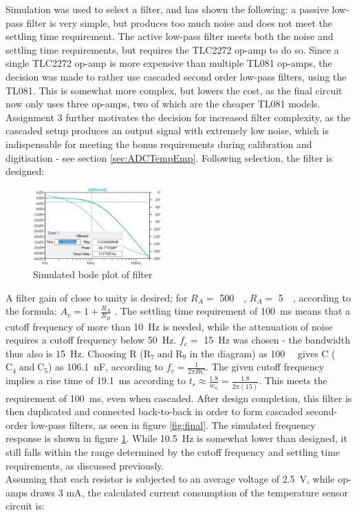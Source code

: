 Simulation was used to select a filter, and has shown the following: a passive low-pass filter is very simple, but produces too much noise and does not meet the settling time requirement. The active low-pass filter meets both the noise and settling time requirements, but requires the TLC2272 op-amp to do so. Since a single TLC2272 op-amp is more expensive than multiple TL081 op-amps, the decision was made to rather use cascaded second order low-pass filters, using the TL081. This is somewhat more complex, but lowers the cost, as the final circuit now only uses three op-amps, two of which are the cheaper TL081 models. Assignment 3 further motivates the decision for increased filter complexity, as the cascaded setup produces an output signal with extremely low noise, which is indispensable for meeting the bonus requirements during calibration and digitisation - see section \ref{sec:ADCTempEmp}. Following selection, the filter is designed:
\begin{figure}
    \centering
    \vspace{-0.5cm}
    \includegraphics[width = 0.44\textwidth]{./Figures/ac}
    \caption{Simulated bode plot of filter}
    \label{fig:ac}
\end{figure}
A filter gain of close to unity is desired; for $R_A = $ \SI{500}{\kilo\Omega}, $R_A =$ \SI{5}{\kilo\Omega}, according to the formula: ${A_v}=1+\frac{{R}_A}{R_B}$ \cite{filter}. The settling time requirement of \SI{100}{ms} means that a cutoff frequency of more than \SI{10}{Hz} is needed, while the attenuation of noise requires a cutoff frequency below \SI{50}{Hz}. $f_c = $ \SI{15}{Hz} was chosen - the bandwidth thus also is \SI{15}{Hz}. Choosing R ($\mathrm{R_7 \; and \; R_9}$ in the diagram) as \SI{100}{\kilo\Omega} gives C ($\mathrm{C_4 \; and \; C_5}$) as \SI{106.1}{nF}, according to $f_c=\frac{1}{2 \pi RC}$. The given cutoff frequency implies a rise time of \SI{19.1}{ms} according to $t_{r} \approx \frac{1.8}{w_{n}} = \frac{1.8}{2 \pi (15)}$\cite{cs}. This meets the requirement of \SI{100}{ms}, even when cascaded. After design completion, this filter is then duplicated and connected back-to-back in order to form cascaded second-order low-pass filters, as seen in figure \ref{fig:final}. The simulated frequency response is shown in figure \ref{fig:ac}. While \SI{10.5}{Hz} is somewhat lower than designed, it still falls within the range determined by the cutoff frequency and settling time requirements, as discussed previously.\\
Assuming that each resistor is subjected to an average voltage of \SI{2.5}{\volt}, while op-amps draws 3 mA\cite{tlc2272}, the calculated current consumption of the temperature sensor circuit is:


